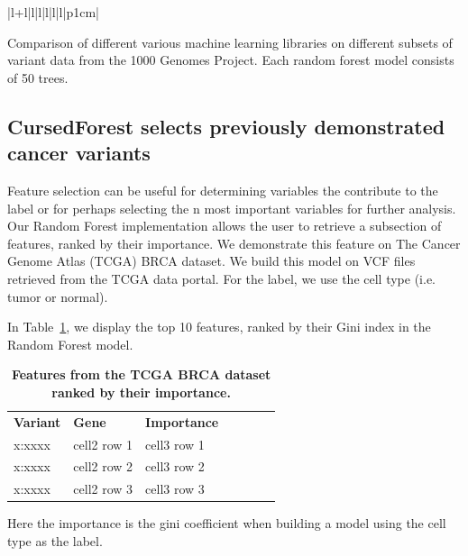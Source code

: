 \documentclass[10pt,a4paper]{article}  %
\newlength\savedwidth
\newcommand\thickhline{\noalign{\global\savedwidth\arrayrulewidth\global\arrayrulewidth 2pt}%
\hline
\noalign{\global\arrayrulewidth\savedwidth}}
\begin{document}
\begin{table}[!ht]
\begin{minipage}{\textwidth}
\begin{adjustwidth}{-1.25in}{0in}
\begin{tabular}{|l+l|l|l|l|l|l|p{1cm}|}
\end{tabular}
\begin{flushleft} 
Comparison of different various machine learning libraries on different subsets of variant data 
from the 1000 Genomes Project.
Each random forest model consists of 50 trees.
\end{flushleft}
\label{table1}
\end{adjustwidth}
\end{minipage}
\end{table}

\subsection{CursedForest selects previously demonstrated cancer variants }
Feature selection can be useful for determining variables the contribute to the label or for perhaps selecting the n most important
variables for further analysis. Our Random Forest implementation allows the user to retrieve a subsection of features, ranked
by their importance. We demonstrate this feature on The Cancer Genome Atlas (TCGA) BRCA dataset. We build this model on
VCF files retrieved from the TCGA data portal. For the label, we use the cell type (i.e. tumor or normal). 

In Table~\ref{table3}, we display the top 10 features, ranked by their Gini index in the Random Forest model.

\begin{table}[!ht]
\centering
\caption{
{\bf Features from the TCGA BRCA dataset ranked by their importance.}}
\begin{tabular}{|l|l|l|l|l|l|l|}
\hline
{\bf Variant} & {\bf Gene} & {\bf Importance}\\ \thickhline
x:xxxx & cell2 row 1 & cell3 row 1\\ \hline
x:xxxx & cell2 row 2 & cell3 row 2\\ \hline
x:xxxx & cell2 row 3 & cell3 row 3\\ \hline
\end{tabular}
\begin{flushleft} Here the importance is the gini coefficient when building a model using the cell type as the label.
\end{flushleft}
\label{table3}
\end{table}
\end{document}
